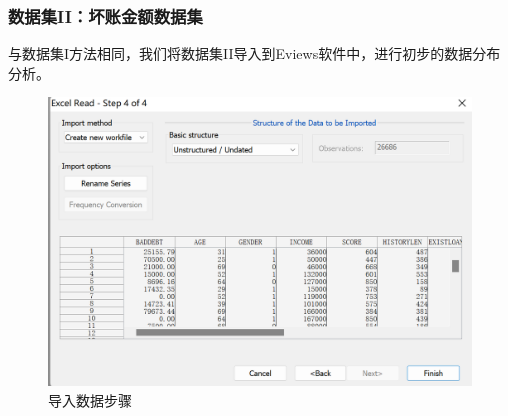 \documentclass[13.5pt,hyperref,a4paper,UTF8]{ctexart}
\begin{document}
\subsubsection{数据集II：坏账金额数据集}

与数据集I方法相同，我们将数据集II导入到Eviews软件中，进行初步的数据分布分析。

\begin{figure}[H]
    \centering
    \includegraphics[width=0.7\linewidth]{figures//2DATABASE//db2/导入数据模型2.png}
    \caption{导入数据步骤}
    \label{导入数据模型2}
\end{figure}
\end{document}
